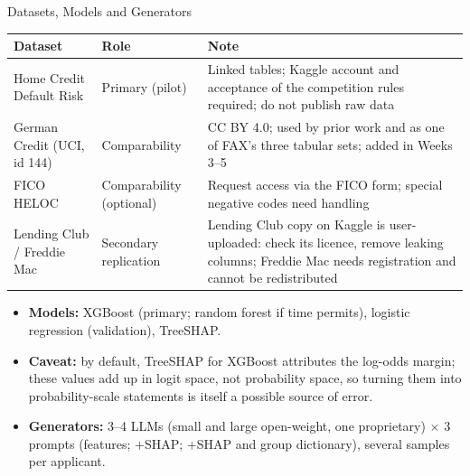 \documentclass[aspectratio=169,10pt]{beamer}
\begin{document}
\begin{frame}{Datasets, Models and Generators}
  \footnotesize
  \renewcommand{\arraystretch}{1.2}
  \begin{tabularx}{\textwidth}{@{}L{3.1cm} L{2.5cm} Y@{}}
    \textbf{\color{vrblue}Dataset} & \textbf{\color{vrblue}Role} & \textbf{\color{vrblue}Note}\\\hline
    Home Credit Default Risk & Primary (pilot) & Linked tables; Kaggle account and acceptance of the competition rules required; do not publish raw data\\
    German Credit (UCI, id 144) & Comparability & CC BY 4.0; used by prior work and as one of FAX's three tabular sets; added in Weeks 3--5\\
    FICO HELOC & Comparability (optional) & Request access via the FICO form; special negative codes need handling\\
    Lending Club / Freddie Mac & Secondary replication & Lending Club copy on Kaggle is user-uploaded: check its licence, remove leaking columns; Freddie Mac needs registration and cannot be redistributed
  \end{tabularx}
  \vspace{1.2ex}
  \begin{itemize}\footnotesize
    \setlength{\itemsep}{0.8ex}
    \item[\textbullet] {\color{vrblue}\bfseries Models:} XGBoost (primary; random forest if time permits), logistic regression (validation), TreeSHAP.
    \item[\textbullet] {\color{vrblue}\bfseries Caveat:} by default, TreeSHAP for XGBoost attributes the log-odds margin; these values add up in logit space, not probability space, so turning them into probability-scale statements is itself a possible source of error.
    \item[\textbullet] {\color{vrblue}\bfseries Generators:} 3--4 LLMs (small and large open-weight, one proprietary) $\times$ 3 prompts (features; +SHAP; +SHAP and group dictionary), several samples per applicant.
  \end{itemize}
\end{frame}
\end{document}
